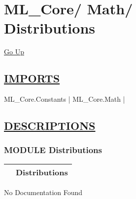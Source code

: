 \chapter*{\color{headfile}
{\large ML\_Core\slash\hspace{0pt}}
{\large Math\slash\hspace{0pt}}
 \\
Distributions
}
\hypertarget{ecldoc:toc:ML_Core.Math.Distributions}{}
\hyperlink{ecldoc:toc:root/ML_Core/Math}{Go Up}

\section*{\underline{\textsf{IMPORTS}}}
\begin{doublespace}
{\large
ML\_Core.Constants |
ML\_Core.Math |
}
\end{doublespace}

\section*{\underline{\textsf{DESCRIPTIONS}}}
\subsection*{\textsf{\colorbox{headtoc}{\color{white} MODULE}
Distributions}}

\hypertarget{ecldoc:ML_Core.Math.Distributions}{}

{\renewcommand{\arraystretch}{1.5}
\begin{tabularx}{\textwidth}{|>{\raggedright\arraybackslash}l|X|}
\hline
\hspace{0pt}\mytexttt{\color{red} } & \textbf{Distributions} \\
\hline
\end{tabularx}
}

\par





No Documentation Found








